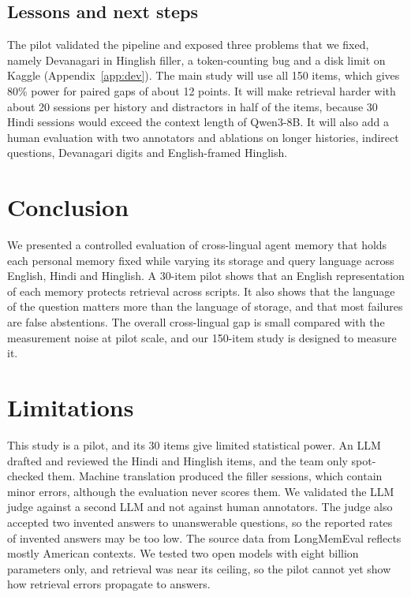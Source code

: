 \documentclass[11pt]{article}
\begin{document}
\subsection{Lessons and next steps}
\label{sec:next}
The pilot validated the pipeline and exposed three problems that we fixed, namely Devanagari in Hinglish filler, a token-counting bug and a disk limit on Kaggle (Appendix~\ref{app:dev}).
The main study will use all 150 items, which gives 80\% power for paired gaps of about 12 points.
It will make retrieval harder with about 20 sessions per history and distractors in half of the items, because 30 Hindi sessions would exceed the context length of Qwen3-8B.
It will also add a human evaluation with two annotators and ablations on longer histories, indirect questions, Devanagari digits and English-framed Hinglish.

\section{Conclusion}
We presented a controlled evaluation of cross-lingual agent memory that holds each personal memory fixed while varying its storage and query language across English, Hindi and Hinglish.
A 30-item pilot shows that an English representation of each memory protects retrieval across scripts.
It also shows that the language of the question matters more than the language of storage, and that most failures are false abstentions.
The overall cross-lingual gap is small compared with the measurement noise at pilot scale, and our 150-item study is designed to measure it.

\section*{Limitations}
This study is a pilot, and its 30 items give limited statistical power.
An LLM drafted and reviewed the Hindi and Hinglish items, and the team only spot-checked them.
Machine translation produced the filler sessions, which contain minor errors, although the evaluation never scores them.
We validated the LLM judge against a second LLM and not against human annotators.
The judge also accepted two invented answers to unanswerable questions, so the reported rates of invented answers may be too low.
The source data from LongMemEval reflects mostly American contexts.
We tested two open models with eight billion parameters only, and retrieval was near its ceiling, so the pilot cannot yet show how retrieval errors propagate to answers.
\end{document}

